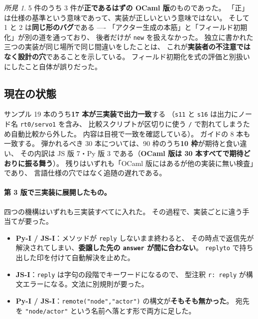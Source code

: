 \documentclass[11pt,a4paper]{ltjsarticle}
\theoremstyle{definition}
\theoremstyle{remark}
\newtheorem{finding}[theorem]{所見}
\begin{document}
\begin{finding}
5 件のうち 3 件が\textbf{正であるはずの OCaml 版}のものであった。
「正」は仕様の基準という意味であって、実装が正しいという意味ではない。
そして 1 と 2 は\textbf{同じ形のバグ}である ----
「アクター生成の本筋」と「フィールド初期化」が別の道を通っており、
後者だけが \texttt{new} を扱えなかった。
独立に書かれた三つの実装が同じ場所で同じ間違いをしたことは、
これが\textbf{実装者の不注意ではなく設計の穴}であることを示している。
フィールド初期化を式の評価と別扱いにしたこと自体が誤りだった。
\end{finding}

\subsection{現在の状態}

サンプル 19 本のうち\textbf{17 本が三実装で出力一致}する
（\texttt{s11} と \texttt{s16} は出力にノード名 \texttt{rt0/servo1} を含み、
比較スクリプトが区切りに使う \texttt{/} で割れてしまうため自動比較から外した。
内容は目視で一致を確認している）。
ガイドの 8 本も一致する。
弾かれるべき 30 本については、90 枠のうち\textbf{10 枠}が期待と食い違い、
その内訳は JS 版 7・Py 版 3 である（\textbf{OCaml 版は 30 本すべてで期待どおりに振る舞う}）。
残りはいずれも「OCaml 版にはあるが他の実装に無い検査」であり、
言語仕様の穴ではなく追随の遅れである。

\paragraph{第 3 版で三実装に展開したもの。}
四つの機構はいずれも三実装すべてに入れた。
その過程で、実装ごとに違う手当てが要った。

\begin{itemize}
\item \textbf{Py-I / JS-I}：メソッドが \texttt{reply} しないまま終わると、
      その時点で返信先が解決されてしまい、\textbf{委譲した先の \texttt{answer} が間に合わない}。
      \texttt{replyto} で持ち出した印を付けて自動解決を止めた。
\item \textbf{JS-I}：\texttt{reply} は字句の段階でキーワードになるので、
      型注釈 \texttt{r: reply} が構文エラーになる。文法に別規則が要った。
\item \textbf{Py-I / JS-I}：\texttt{remote("node","actor")} の構文が\textbf{そもそも無かった}。
      宛先を \texttt{"node/actor"} という名前へ落とす形で両方に足した。
\end{itemize}
\end{document}
